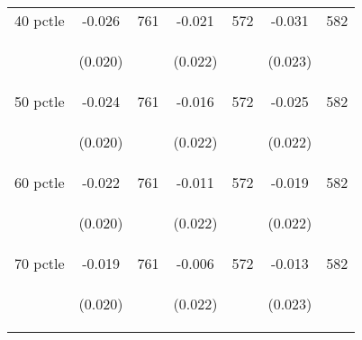 \begin{tabular}{lcccccc}
40 pctle   &  -0.026   &  761  &   -0.021  &  572 &  -0.031  &  582   \\

\vspace{4pt} &  \begin{footnotesize}(0.020)\end{footnotesize}   & &
			    \begin{footnotesize}(0.022)\end{footnotesize}   & &
			    \begin{footnotesize}(0.023)\end{footnotesize}   &
			     \\          

50 pctle   &  -0.024   &  761  &   -0.016  &  572 &  -0.025  &  582   \\

\vspace{4pt} &  \begin{footnotesize}(0.020)\end{footnotesize}   & &
			    \begin{footnotesize}(0.022)\end{footnotesize}   & &
			    \begin{footnotesize}(0.022)\end{footnotesize}   &
			     \\          

60 pctle   &  -0.022   &  761  &   -0.011  &  572 &  -0.019  &  582   \\


\vspace{4pt} &  \begin{footnotesize}(0.020)\end{footnotesize}   & &
			    \begin{footnotesize}(0.022)\end{footnotesize}   & &
			    \begin{footnotesize}(0.022)\end{footnotesize}   &
			     \\          

70 pctle   &  -0.019   &  761  &   -0.006  &  572 &  -0.013  &  582   \\

\vspace{4pt} &  \begin{footnotesize}(0.020)\end{footnotesize}   & &
			    \begin{footnotesize}(0.022)\end{footnotesize}   & &
			    \begin{footnotesize}(0.023)\end{footnotesize}   &
			     \\          


\end{tabular}
